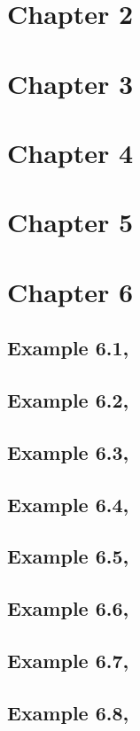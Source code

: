 \documentclass{article}\usepackage[]{graphicx}\usepackage[]{color}
\begin{document}
\section{Chapter 2}



\section{Chapter 3}



\section{Chapter 4}



\section{Chapter 5}



\section{Chapter 6}

\subsection{Example 6.1,}
\subsection{Example 6.2,}
\subsection{Example 6.3,}
\subsection{Example 6.4,}
\subsection{Example 6.5,}
\subsection{Example 6.6,}
\subsection{Example 6.7,}
\subsection{Example 6.8,}
\end{document}
